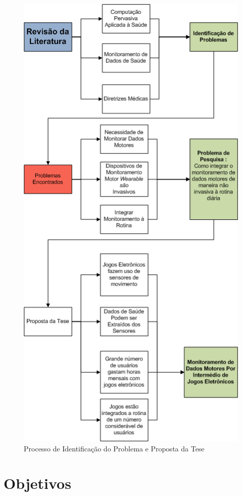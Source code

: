 \begin{figure}[!H]
 \centering
 \includegraphics[scale=0.8]{./img/problematica.png}
\caption{Processo de Identificação do Problema e Proposta da Tese}
 \label{fig:problematica}
\end{figure}
\FloatBarrier

\section{Objetivos}
